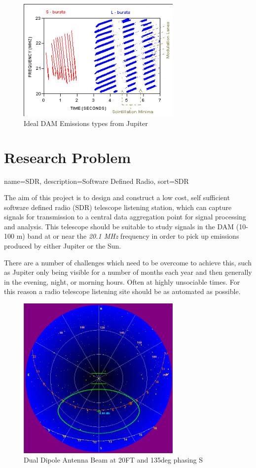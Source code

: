 \documentclass[runningheads,a4paper]{llncs}
\begin{document}
%
\begin{figure}[here]
\centering
\includegraphics[width=8cm]{images/05}
\caption{Ideal DAM Emissions types from Jupiter \citep{wilkinson94}}
\label{fig:dam_emissions_spectrum}
\end{figure}
%

%
\newpage
\section*{Research Problem}
%
{
  name={SDR},
  description={Software Defined Radio},
  sort=SDR
}

The aim of this project is to design and construct a low cost, self sufficient software defined radio (\gls{SDR}) telescope listening station, which can capture signals for transmission to a central data aggregation point for signal processing and analysis. This telescope should be suitable to study signals  in the \gls{DAM} (10-100 m) band at or near the \textit{20.1 MHz} frequency in order to pick up emissions produced by either Jupiter or the Sun.

There are a number of challenges which need to be overcome to achieve this, such as Jupiter only being visible for a number of months each year and then generally in the evening, night, or morning hours. Often at highly unsociable times. For this reason a radio telescope listening site should be as automated as possible.

%
\begin{figure}[here]
\centering
\includegraphics[width=8cm]{images/07}
\caption{Dual Dipole Antenna Beam at 20FT and 135deg phasing S \citep{nasa12}}
\label{fig:dual_dipole_20ft_135phasing_s}
\end{figure}
%
\end{document}
